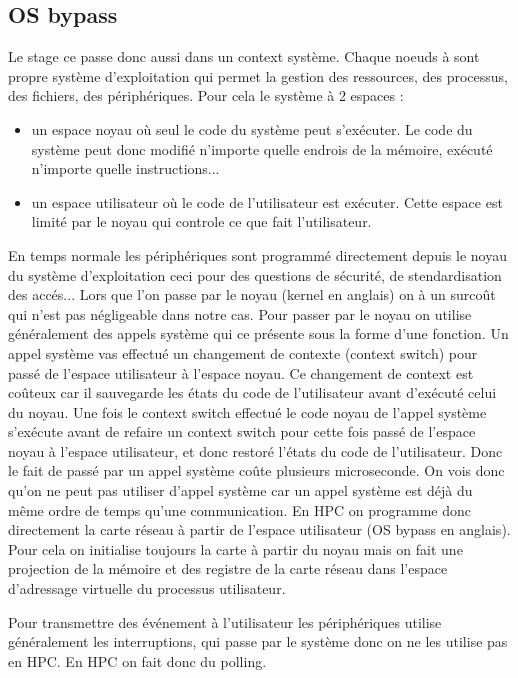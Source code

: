 \subsection{OS bypass}

Le stage ce passe donc aussi dans un context système.
Chaque noeuds à sont propre système d'exploitation qui permet la gestion des ressources, des processus, des fichiers, des périphériques.
Pour cela le système à 2 espaces :
\begin{itemize}
  \item un espace noyau où seul le code du système peut s'exécuter. Le code du système peut donc modifié n'importe quelle endrois de la mémoire, exécuté n'importe quelle instructions...
  \item un espace utilisateur où le code de l'utilisateur est exécuter. Cette espace est limité par le noyau qui controle ce que fait l'utilisateur.
\end{itemize}

En temps normale les périphériques sont programmé directement depuis le noyau du système d'exploitation ceci pour des questions de sécurité, de stendardisation des accés...
Lors que l'on passe par le noyau (kernel en anglais) on à un surcoût qui n'est pas négligeable dans notre cas.
Pour passer par le noyau on utilise généralement des appels système qui ce présente sous la forme d'une fonction.
Un appel système vas effectué un changement de contexte (context switch) pour passé de l'espace utilisateur à l'espace noyau.
Ce changement de context est coûteux car il sauvegarde les états du code de l'utilisateur avant d'exécuté celui du noyau.
Une fois le context switch effectué le code noyau de l'appel système s'exécute avant de refaire un context switch pour cette fois passé de l'espace noyau à l'espace utilisateur, et donc restoré l'états du code de l'utilisateur.
Donc le fait de passé par un appel système coûte plusieurs microseconde.
On vois donc qu'on ne peut pas utiliser d'appel système car un appel système est déjà du même ordre de temps qu'une communication.
En HPC on programme donc directement la carte réseau à partir de l'espace utilisateur (OS bypass en anglais).
Pour cela on initialise toujours la carte à partir du noyau mais on fait une projection de la mémoire et des registre de la carte réseau dans l'espace d'adressage virtuelle du processus utilisateur.

Pour transmettre des événement à l'utilisateur les périphériques utilise généralement les interruptions, qui passe par le système donc on ne les utilise pas en HPC.
En HPC on fait donc du polling.

